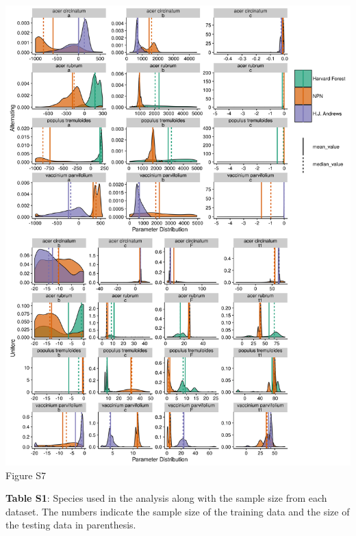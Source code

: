 \documentclass[a4paper,12pt]{article}
\begin{document}
\begin{center}
	\centering
		\includegraphics[scale=0.5]{supplement_select_species_param_comparison2.png}
	Figure S7
\end{center}
\newpage

\textbf{Table S1}: Species used in the analysis along with the sample size from each dataset. The numbers indicate the sample size of the training data and the size of the testing data in parenthesis. 

\newpage
\end{document}
